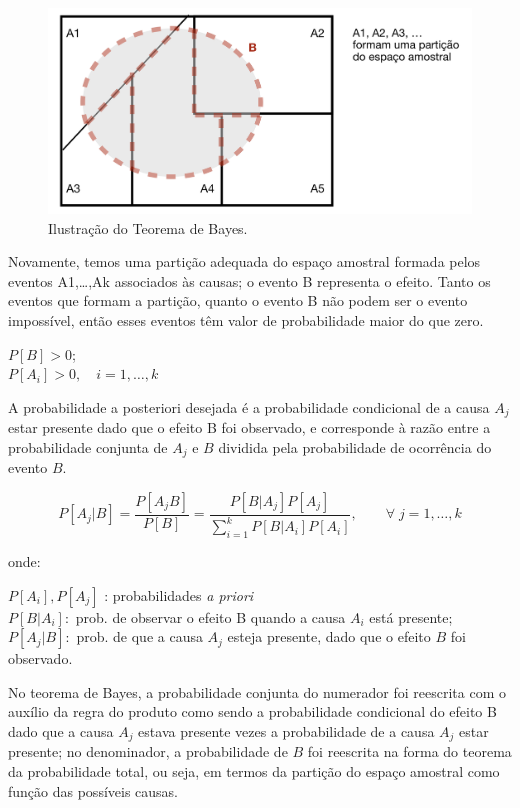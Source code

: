 \documentclass[
]{book}
\theoremstyle{definition}
\theoremstyle{definition}
\theoremstyle{definition}
\theoremstyle{remark}
\begin{document}
\begin{figure}
\includegraphics[width=0.8\linewidth]{img/TBayes} \caption{Ilustração do Teorema de Bayes.}\label{fig:ch4-TBayes}
\end{figure}

Novamente, temos uma partição adequada do espaço amostral formada pelos eventos A1,\ldots,Ak associados às causas; o evento B representa o efeito. Tanto os eventos que formam a partição, quanto o evento B não podem ser o evento impossível, então esses eventos têm valor de probabilidade maior do que zero.

\(P[B] > 0\);\\
\(P[A_i] > 0, \quad i =1, \ldots,k\)

A probabilidade a posteriori desejada é a probabilidade condicional de a causa \(A_j\) estar presente dado que o efeito B foi observado, e corresponde à razão entre a probabilidade conjunta de \(A_j\) e \(B\) dividida pela probabilidade de ocorrência do evento \(B\).

\[ P[A_j|B] = \frac{P[A_jB]}{P[B]} =\frac{P[B|A_j]P[A_j]}{\sum_{i=1}^{k} P[B|A_i] P[A_i]},  \qquad \forall \; j= 1, \ldots, k\]

onde:

\(P[A_i], P[A_j]\) : probabilidades \emph{a priori}\\
\(P[B|A_i]:\) prob. de observar o efeito B quando a causa \({A_i}\) está presente;\\
\(P[A_j|B]:\) prob. de que a causa \({A_j}\) esteja presente, dado que o efeito \({B}\) foi observado.

No teorema de Bayes, a probabilidade conjunta do numerador foi reescrita com o auxílio da regra do produto como sendo a probabilidade condicional do efeito B dado que a causa \(A_j\) estava presente vezes a probabilidade de a causa \(A_j\) estar presente; no denominador, a probabilidade de \(B\) foi reescrita na forma do teorema da probabilidade total, ou seja, em termos da partição do espaço amostral como função das possíveis causas.
\end{document}
